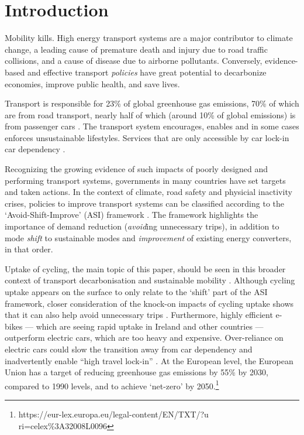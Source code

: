 \documentclass[
  super,
  preprint,
  3p]{elsarticle}
\begin{document}
\newpage{}

\hypertarget{introduction}{%
\section{Introduction}\label{introduction}}

Mobility kills. High energy transport systems are a major contributor to
climate change, a leading cause of premature death and injury due to
road traffic collisions, and a cause of disease due to airborne
pollutants. Conversely, evidence-based and effective transport
\emph{policies} have great potential to decarbonize economies, improve
public health, and save lives.

Transport is responsible for 23\% of global greenhouse gas emissions,
70\% of which are from road transport, nearly half of which (around 10\%
of global emissions) is from passenger cars \citep{jaramillo2022}. The
transport system encourages, enables and in some cases enforces
unsustainable lifestyles. Services that are only accessible by car
lock-in car dependency
\citep{gray2001, shergold2012, motte-baumvol2010}.

Recognizing the growing evidence of such impacts of poorly designed and
performing transport systems, governments in many countries have set
targets and taken actions. In the context of climate, road safety and
physicial inactivity crises, policies to improve transport systems can
be classified according to the `Avoid-Shift-Improve' (ASI) framework
\citep{jaramillo2022}. The framework highlights the importance of demand
reduction (\emph{avoid}ing unnecessary trips), in addition to mode
\emph{shift} to sustainable modes and \emph{improvement} of existing
energy converters, in that order.

Uptake of cycling, the main topic of this paper, should be seen in this
broader context of transport decarbonisation \citep{brand2020} and
sustainable mobility \citep{burns2013}. Although cycling uptake appears
on the surface to only relate to the `shift' part of the ASI framework,
closer consideration of the knock-on impacts of cycling uptake shows
that it can also help avoid unnecessary trips \citep{nello-deakin2020}.
Furthermore, highly efficient e-bikes --- which are seeing rapid uptake
in Ireland and other countries --- outperform electric cars, which are
too heavy and expensive. Over-reliance on electric cars could slow the
transition away from car dependency and inadvertently enable ``high
travel lock-in'' \citep{anable2019}. At the European level, the European
Union has a target of reducing greenhouse gas emissions by 55\% by 2030,
compared to 1990 levels, and to achieve `net-zero' by 2050.\footnote{https://eur-lex.europa.eu/legal-content/EN/TXT/?u
  ri=celex\%3A32008L0096}
\end{document}
